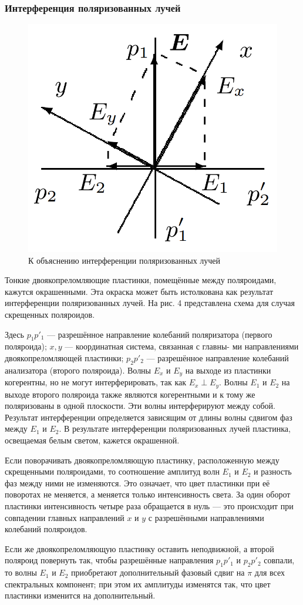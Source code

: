 \subsubsection{Интерференция поляризованных лучей}

\begin{figure}[!hb]
	\centering
	\includegraphics[width=0.25\linewidth]{pics/pic_4.png}
	\caption{{К объяснению интерференции поляризованных лучей}}
	\label{pic_4}
\end{figure}

Тонкие двоякопреломляющие пластинки, помещённые между поляроидами, кажутся окрашенными. Эта окраска может быть истолкована как результат интерференции поляризованных лучей. На рис. 4 представлена схема для
случая скрещенных поляроидов.

Здесь $ p_1p'_1 $ --- разрешённое направление колебаний поляризатора
(первого поляроида); $ x, y $ --- координатная система, связанная с главны-
ми направлениями двоякопреломляющей пластинки; $ p_2p'_2 $ --- разрешённое направление колебаний анализатора (второго поляроида). Волны
$ E_x  $ и $ E_y $ на выходе из пластинки когерентны, но не могут интерферировать, так как $ E_x \perp  E_y $. Волны $ E_1 $ и $ E_2 $ на выходе второго поляроида
также являются когерентными и к тому же поляризованы в одной плоскости. Эти волны интерферируют между собой. Результат интерференции определяется зависящим от длины волны сдвигом фаз между $ E_1 $
и $ E_2 $. В результате интерференции поляризованных лучей пластинка, освещаемая белым светом, кажется окрашенной.

Если поворачивать двоякопреломляющую пластинку, расположенную между
скрещенными поляроидами, то соотношение амплитуд волн $ E_1 $ и $ E_2 $ и разность фаз между ними не изменяются. Это означает, что цвет пластинки при её поворотах не меняется, а меняется только интенсивность света. За один оборот пластинки интенсивность четыре раза обращается в нуль --- это происходит при совпадении главных направлений
$ x $ и $ y $ с разрешёнными направлениями колебаний поляроидов.

Если же двоякопреломляющую пластинку оставить неподвижной, а
второй поляроид повернуть так, чтобы разрешённые направления $ p_1p'_1 $
и $ p_2p'_2 $ совпали, то волны $ E_1 $ и $ E_2 $ приобретают дополнительный фазовый сдвиг на $ \pi $ для всех спектральных компонент; при этом их амплитуды изменятся так, что цвет пластинки изменится на дополнительный. 

